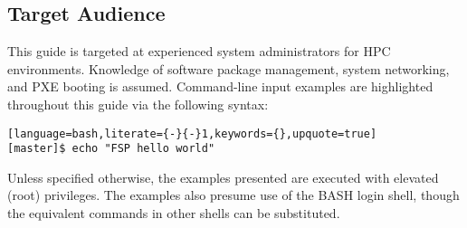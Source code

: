 \subsection{Target Audience}

This guide is targeted at experienced \Linux{} system administrators for HPC
environments. Knowledge of software package management, system networking, and
PXE booting is assumed.  Command-line input examples are highlighted throughout
this guide via the following syntax:

\begin{lstlisting}[language=bash,literate={-}{-}1,keywords={},upquote=true]
[master]$ echo "FSP hello world"
\end{lstlisting}

Unless specified otherwise, the examples presented are executed with
elevated (root) privileges. The examples also presume use of the BASH login
shell, though the equivalent commands in other shells can be substituted.
